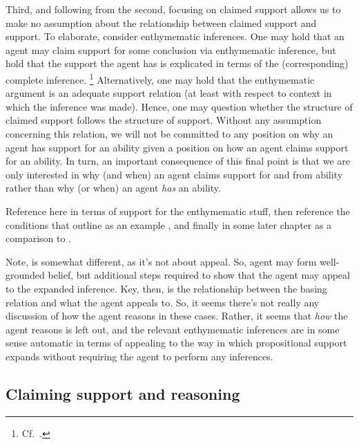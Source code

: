 \begin{note}
  Third, and following from the second, focusing on claimed support allows us to make no assumption about the relationship between claimed support and support.
  To elaborate, consider enthymematic inferences.
  One may hold that an agent may claim support for some conclusion via enthymematic inference, but hold that the support the agent has is explicated in terms of the (corresponding) complete inference.\nolinebreak
  \footnote{
    Cf.\ \textcite{Moretti:2019wx}.
  }
  Alternatively, one may hold that the enthymematic argument is an adequate support relation (at least with respect to context in which the inference was made).
  Hence, one may question whether the structure of claimed support follows the structure of support.
  Without any assumption concerning this relation, we will not be committed to any position on why an agent has support for an ability given a position on how an agent claims support for an ability.
  In turn, an important consequence of this final point is that we are only interested in why (and when) an agent claims support for and from ability rather than why (or when) an agent \emph{has} an ability.

  {
    \color{red}
    Reference \citeauthor{Moretti:2019wx} here in terms of support for the enthymematic stuff, then reference the conditions that \citeauthor{Moretti:2019wx} outline as an example \ESU{}, and finally in some later chapter as a comparison to \EAS{}.
    \citeauthor{Moretti:2019wx}

    Note, \citeauthor{Moretti:2019wx} is somewhat different, as it's not about appeal.
    So, agent may form well-grounded belief, but additional steps required to show that the agent may appeal to the expanded inference.
    Key, then, is the relationship between the basing relation and what the agent appeals to.
    So, it seems there's not really any discussion of how the agent reasons in these cases.
    Rather, it seems that \emph{how} the agent reasons is left out, and the relevant enthymematic inferences are in some sense automatic in terms of appealing to the way in which propositional support expands without requiring the agent to perform any inferences.
  }
\end{note}

\subsection{Claiming support and reasoning}
\label{sec:claimed-support}

